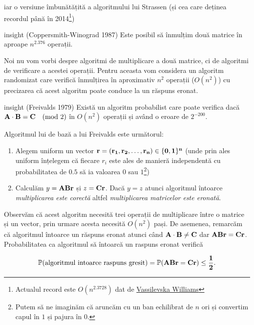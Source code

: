 \documentclass[]{article}
\let\rmarkdownfootnote\footnote%
\def\footnote{\protect\rmarkdownfootnote}
\newenvironment{frshaded_insight*}{%
  \def\FrameCommand{\fboxrule=\FrameRule\fboxsep=\FrameSep \fcolorbox{framecolor_insight}{shadecolor_insight}}%
  \MakeFramed {\advance\hsize-\width \FrameRestore}}%
{\endMakeFramed}
\newenvironment{rmdblock_insight}[1]
  {\begin{frshaded_insight*}
  \begin{itemize}
  \renewcommand{\labelitemi}{
    \raisebox{-.7\height}[0pt][0pt]{
      {\setkeys{Gin}{width=2em,keepaspectratio}\texttt{[image: images/icons/\#1]}}
    }
  }
  \item
  }
  {
  \end{itemize}
  \end{frshaded_insight*}
  }
\newenvironment{rmdinsight}
  {\begin{rmdblock_insight}{insight}}
  {\end{rmdblock_insight}}
\begin{document}
iar o versiune îmbunătățită a algoritmului lui Strassen (și cea care
deținea recordul până în 2014\footnote{Actualul record este
  \(O(n^{2.3728})\) dat de
  \href{http://theory.stanford.edu/~virgi/matrixmult-f.pdf}{Vassilevska
  Williams}})

\begin{rmdinsight}
(Coppersmith-Winograd 1987) Este posibil să înmulțim două matrice în
aproape \(n^{2.376}\) operații.
\end{rmdinsight}

Noi nu vom vorbi despre algoritmi de multiplicare a două matrice, ci de
algoritmi de verificare a acestei operații. Pentru aceasta vom considera
un algoritm randomizat care verifică înmulțirea în aproximativ \(n^2\)
operații (\(O(n^2)\)) cu precizarea că acest algoritm poate conduce la
un răspuns eronat.

\begin{rmdinsight}
(Freivalds 1979) Există un algoritm probabilist care poate verifica dacă
\(\bf{A}\cdot\bf{B}=\bf{C} \quad (\text{mod 2})\) în \(O(n^2)\) operații
și având o eroare de \(2^{-200}\).
\end{rmdinsight}

Algoritmul lui de bază a lui Freivalds este următorul:

\begin{enumerate}
\def\labelenumi{\arabic{enumi}.}
\item
  Alegem uniform un vector \(\bf{r}=(r_1,r_2,\ldots,r_n)\in\{0,1\}^n\)
  (unde prin ales uniform înțelegem că fiecare \(r_i\) este ales de
  manieră independentă cu probabilitatea de \(0.5\) să ia valoarea \(0\)
  sau \(1\)\footnote{Putem să ne imaginăm că aruncăm cu un ban
    echilibrat de \(n\) ori și convertim capul în \(1\) și pajura în
    \(0\).})
\item
  Calculăm \(y = \bf{A}\bf{B}\bf{r}\) și \(z = \bf{C}\bf{r}\). Dacă
  \(y = z\) atunci algoritmul întoarce \emph{multiplicarea este corectă}
  altfel \emph{multiplicarea matricelor este eronată}.
\end{enumerate}

Observăm că acest algoritm necesită trei operații de multiplicare între
o matrice și un vector, prin urmare acesta necesită \(O(n^2)\) pași. De
asemenea, remarcăm că algoritmul întoarce un răspuns eronat atunci când
\(\bf{A}\cdot\bf{B}\neq\bf{C}\) dar
\(\bf{A}\bf{B}\bf{r} = \bf{C}\bf{r}\). Probabilitatea ca algoritmul să
întoarcă un raspuns eronat verifică

\[
  \mathbb{P}(\text{algoritmul intoarce raspuns gresit}) = \mathbb{P}(\bf{A}\bf{B}\bf{r} = \bf{C}\bf{r}) \leq \frac{1}{2}.
\]
\end{document}
